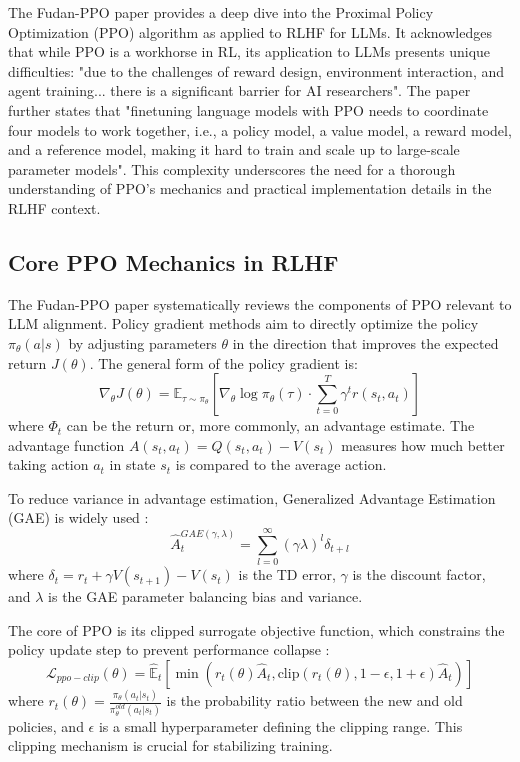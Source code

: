 \documentclass[10pt,journal,compsoc]{IEEEtran} %
\begin{document}
The Fudan-PPO paper \cite{Zheng2023PPO} provides a deep dive into the Proximal Policy Optimization (PPO) algorithm as applied to RLHF for LLMs. It acknowledges that while PPO is a workhorse in RL, its application to LLMs presents unique difficulties: "due to the challenges of reward design, environment interaction, and agent training... there is a significant barrier for AI researchers". \cite{Zheng2023PPO} The paper further states that "finetuning language models with PPO needs to coordinate four models to work together, i.e., a policy model, a value model, a reward model, and a reference model, making it hard to train and scale up to large-scale parameter models". \cite{Zheng2023PPO} This complexity underscores the need for a thorough understanding of PPO's mechanics and practical implementation details in the RLHF context.

\subsection{Core PPO Mechanics in RLHF}
The Fudan-PPO paper systematically reviews the components of PPO relevant to LLM alignment.
Policy gradient methods aim to directly optimize the policy $\pi_\theta(a|s)$ by adjusting parameters $\theta$ in the direction that improves the expected return $J(\theta)$. \cite{Zheng2023PPO} The general form of the policy gradient is:
$$ \nabla_\theta J(\theta) = \mathbb{E}_{\tau \sim \pi_\theta} \left[ \nabla_\theta \log \pi_\theta(\tau) \cdot \sum_{t=0}^{T} \gamma^t r(s_t, a_t) \right] $$
where $\Phi_t$ can be the return or, more commonly, an advantage estimate. The advantage function $A(s_t, a_t) = Q(s_t, a_t) - V(s_t)$ measures how much better taking action $a_t$ in state $s_t$ is compared to the average action. \cite{Zheng2023PPO}

To reduce variance in advantage estimation, Generalized Advantage Estimation (GAE) is widely used \cite{Zheng2023PPO}:
$$ \hat{A}_t^{GAE(\gamma,\lambda)} = \sum_{l=0}^{\infty} (\gamma\lambda)^l \delta_{t+l} $$
where $\delta_t = r_t + \gamma V(s_{t+1}) - V(s_t)$ is the TD error, $\gamma$ is the discount factor, and $\lambda$ is the GAE parameter balancing bias and variance.

The core of PPO is its clipped surrogate objective function, which constrains the policy update step to prevent performance collapse \cite{Zheng2023PPO}:
$$ \mathcal{L}_{ppo-clip}(\theta)=\hat{\mathbb{E}}_{t}[\min(r_t(\theta)\hat{A}_{t}, \text{clip}(r_t(\theta),1-\epsilon,1+\epsilon)\hat{A}_{t})] $$
where $r_t(\theta) = \frac{\pi_\theta(a_t|s_t)}{\pi_\theta^{old}(a_t|s_t)}$ is the probability ratio between the new and old policies, and $\epsilon$ is a small hyperparameter defining the clipping range. This clipping mechanism is crucial for stabilizing training.
\end{document}
